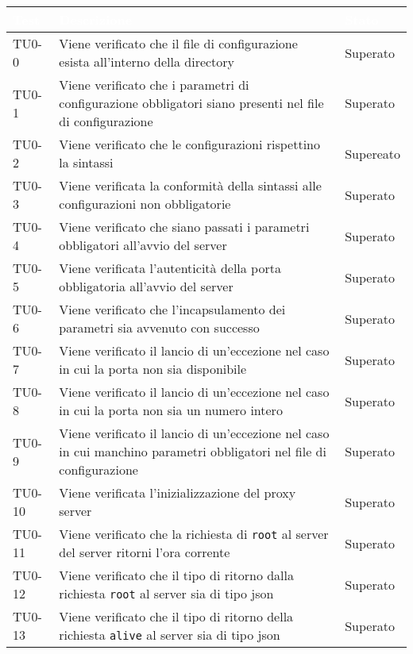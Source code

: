 \begin{longtable}{|C{.15\textwidth}|m{.65\textwidth}|C{.20\textwidth}|}
\hline
{}\textbf{\textcolor{white}{Test}}  & \textbf{\textcolor{white}{Descrizione}} & \textbf{\textcolor{white}{Stato}}\\
\hline \hline
\endhead

TU0-0 & Viene verificato che il file di configurazione esista all'interno della directory & Superato\\
\hline 
{} TU0-1 & Viene verificato che i parametri di configurazione obbligatori siano presenti nel file di configurazione & Superato \\ 
\hline
TU0-2 & Viene verificato che le configurazioni rispettino la sintassi & Supereato \\ 
\hline
{} TU0-3 & Viene verificata la conformità della sintassi alle configurazioni non obbligatorie & Superato \\ 
\hline 
TU0-4 & Viene verificato che siano passati i parametri obbligatori all'avvio del server & Superato \\ 
\hline
{} TU0-5 & Viene verificata l'autenticità della porta obbligatoria all'avvio del server & Superato \\ 
\hline
TU0-6 & Viene verificato  che l'incapsulamento dei parametri sia avvenuto con successo & Superato \\
\hline 
{} TU0-7 & Viene verificato il lancio di un'eccezione nel caso in cui la porta non sia disponibile & Superato \\ 
\hline 
TU0-8 & Viene verificato il lancio di un'eccezione nel caso in cui la porta non sia un numero intero & Superato \\
\hline
{}  TU0-9 & Viene verificato il lancio di un'eccezione nel caso in cui manchino parametri obbligatori nel file di configurazione & Superato \\ 
\hline
TU0-10 & Viene verificata l'inizializzazione del proxy server & Superato \\ 
\hline 
{} TU0-11 & Viene verificato che la richiesta di \texttt{root} al server del server ritorni l'ora corrente & Superato \\ 
\hline
TU0-12 & Viene verificato che il tipo di ritorno dalla richiesta \texttt{root} al server sia di tipo json & Superato \\ 
\hline 
{}TU0-13 & Viene verificato che il tipo di ritorno della richiesta \texttt{alive} al server sia di tipo json & Superato \\ 

\end{longtable}
